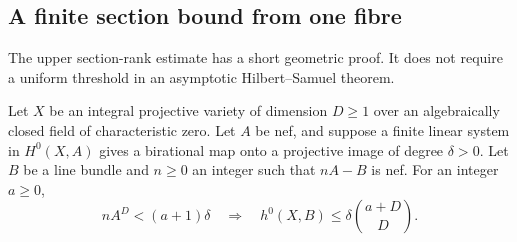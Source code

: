 \subsection{A finite section bound from one fibre}
\label{sec:finite-section-jets}

The upper section-rank estimate has a short geometric proof. It does
not require a uniform threshold in an asymptotic Hilbert--Samuel theorem.

\begin{proposition}\label{prop:finite-section-jets}
Let $X$ be an integral projective variety of dimension $D\ge1$ over
an algebraically closed field of characteristic zero. Let $A$ be nef,
and suppose a finite linear system in $H^0(X,A)$ gives a birational
map onto a projective image of degree $\delta>0$. Let $B$ be a line
bundle and $n\ge0$ an integer such that $nA-B$ is nef. For an integer $a\ge0$,
\[
 nA^D<(a+1)\delta
 \quad\Longrightarrow\quad
 h^0(X,B)\le\delta\binom{a+D}{D}.
\]
\end{proposition}

